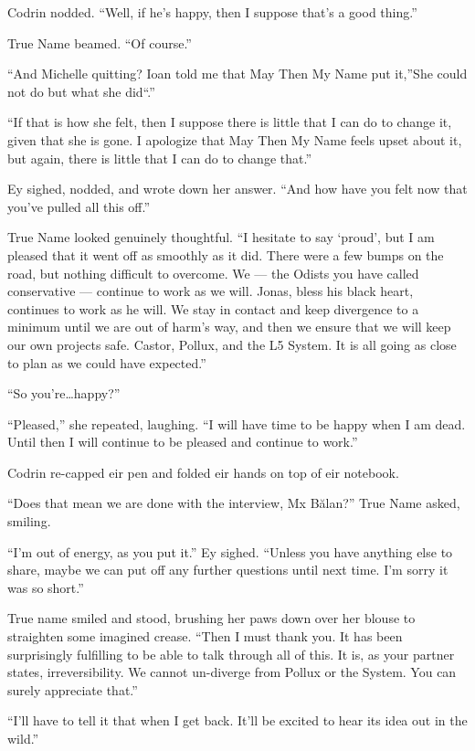 Codrin nodded. ``Well, if he's happy, then I suppose that's a good thing.''

True Name beamed. ``Of course.''

``And Michelle quitting? Ioan told me that May Then My Name put it,''She could not do but what she did``.''

``If that is how she felt, then I suppose there is little that I can do to change it, given that she is gone. I apologize that May Then My Name feels upset about it, but again, there is little that I can do to change that.''

Ey sighed, nodded, and wrote down her answer. ``And how have you felt now that you've pulled all this off.''

True Name looked genuinely thoughtful. ``I hesitate to say `proud', but I am pleased that it went off as smoothly as it did. There were a few bumps on the road, but nothing difficult to overcome. We — the Odists you have called conservative — continue to work as we will. Jonas, bless his black heart, continues to work as he will. We stay in contact and keep divergence to a minimum until we are out of harm's way, and then we ensure that we will keep our own projects safe. Castor, Pollux, and the L5 System. It is all going as close to plan as we could have expected.''

``So you're\ldots happy?''

``Pleased,'' she repeated, laughing. ``I will have time to be happy when I am dead. Until then I will continue to be pleased and continue to work.''

Codrin re-capped eir pen and folded eir hands on top of eir notebook.

``Does that mean we are done with the interview, Mx Bălan?'' True Name asked, smiling.

``I'm out of energy, as you put it.'' Ey sighed. ``Unless you have anything else to share, maybe we can put off any further questions until next time. I'm sorry it was so short.''

True name smiled and stood, brushing her paws down over her blouse to straighten some imagined crease. ``Then I must thank you. It has been surprisingly fulfilling to be able to talk through all of this. It is, as your partner states, irreversibility. We cannot un-diverge from Pollux or the System. You can surely appreciate that.''

``I'll have to tell it that when I get back. It'll be excited to hear its idea out in the wild.''

